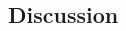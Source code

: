 \documentclass[12pt,english]{article}
\begin{document}
\begin{spacing}{1.9}
\begin{flushleft}





\section*{Discussion}

\end{flushleft}
\end{spacing}
\end{document}
